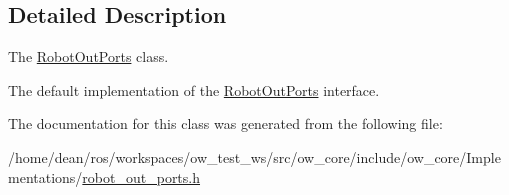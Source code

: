 \subsection{Detailed Description}
The \hyperlink{classow__core_1_1RobotOutPorts}{Robot\+Out\+Ports} class. 

The default implementation of the \hyperlink{classow__core_1_1RobotOutPorts}{Robot\+Out\+Ports} interface. 

The documentation for this class was generated from the following file\+:\begin{DoxyCompactItemize}
\item 
/home/dean/ros/workspaces/ow\+\_\+test\+\_\+ws/src/ow\+\_\+core/include/ow\+\_\+core/\+Implementations/\hyperlink{robot__out__ports_8h}{robot\+\_\+out\+\_\+ports.\+h}\end{DoxyCompactItemize}
